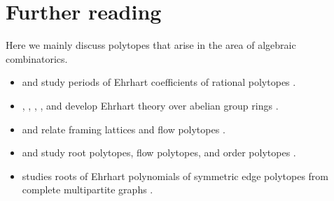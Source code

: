 \section[polytopePapers]{Further reading}

Here we mainly discuss polytopes that arise in the area of algebraic combinatorics.

\begin{itemize}

\item {} and  study periods
of Ehrhart coefficients of rational polytopes \cite{McAllisterRochais2018}.

\item {}, , ,
, and  develop Ehrhart theory over
abelian group rings \cite{DavisLoeraGarberJochemkoYu2025x}.

\item {} and  relate framing lattices
and flow polytopes \cite{BellCeballos2025x}.

\item {} and  study root
polytopes, flow polytopes, and order polytopes \cite{RietschWilliams2024x}.

\item {} studies roots of Ehrhart polynomials of symmetric edge
polytopes from complete multipartite graphs \cite{Kolbl2024x}.

\end{itemize}
